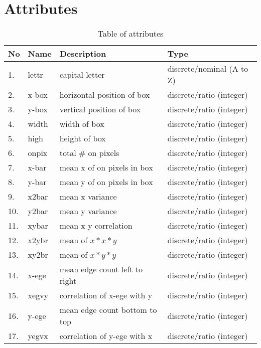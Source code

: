 \chapter*{Attributes}


\begin{table}[ht!]
    \centering
    \begin{tabular}{|l|l|l|l|}
         \hline
             No & Name & Description & Type \\ \hline
             1. & lettr & capital letter             & discrete/nominal (A to Z)  \\ \hline
             2. & x-box & horizontal position of box & discrete/ratio (integer)   \\ \hline
             3. & y-box & vertical position of box   & discrete/ratio (integer)   \\ \hline
             4. & width & width of box               & discrete/ratio (integer)   \\ \hline
             5. & high  & height of box              & discrete/ratio (integer)   \\ \hline
             6. & onpix & total \# on pixels         & discrete/ratio (integer)   \\ \hline
             7. & x-bar & mean x of on pixels in box & discrete/ratio (integer)   \\ \hline
             8. & y-bar & mean y of on pixels in box & discrete/ratio (integer)   \\ \hline
             9. & x2bar & mean x variance            & discrete/ratio (integer)   \\ \hline
            10. & y2bar & mean y variance            & discrete/ratio (integer)   \\ \hline
            11. & xybar & mean x y correlation       & discrete/ratio (integer)   \\ \hline
            12. & x2ybr & mean of $x * x * y$        & discrete/ratio (integer)   \\ \hline
            13. & xy2br & mean of $x * y * y$        & discrete/ratio (integer)   \\ \hline
            14. & x-ege & mean edge count left to right  & discrete/ratio (integer) \\ \hline
            15. & xegvy & correlation of x-ege with y    & discrete/ratio (integer) \\ \hline
            16. & y-ege & mean edge count bottom to top  & discrete/ratio (integer) \\ \hline
            17. & yegvx & correlation of y-ege with x    & discrete/ratio (integer) \\
         \hline
    \end{tabular}
    \caption{Table of attributes}
\end{table}





